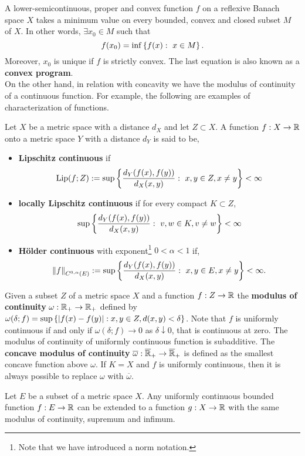A  lower-semicontinuous, proper and convex function $f$ on a reflexive Banach space $X$ takes a minimum value on every bounded, convex and closed subset $M$ of $X$. In other words, $\exists x_0 \in M$ such that
\begin{equation}
f(x_0)=\inf\left\lbrace f(x):\ x\in M \right\rbrace.
\end{equation}
Moreover, $x_0$ is unique if $f$ is strictly convex. The last equation is also known as a \textbf{convex program}. \\

On the other hand, in relation with concavity we have the modulus of continuity of a continuous function. For example, the following are examples of characterization of functions.
\begin{definition}
	Let $X$ be a metric space with a distance $d_X$ and let $Z \subset X$. A function $f: X\rightarrow \mathbb{R}$ onto a metric space $Y$ with a distance $d_Y$ is said to be,
	\begin{itemize}
		\item \textbf{Lipschitz continuous} if
		\begin{equation*}
		\mathrm{Lip}(f; Z):=\sup\left\lbrace \frac{d_Y(f(x), f(y))}{d_X(x,y)}: \ x,y \in Z, x\neq y \right\rbrace < \infty
		\end{equation*}
		\item \textbf{locally Lipschitz continuous} if for every compact $K\subset Z$,
		\begin{equation*}
		\sup\left\lbrace \frac{d_Y(f(x), f(y))}{d_X(x,y)}: \ v,w \in K, v\neq w \right\rbrace<\infty
		\end{equation*}
		\item  \textbf{H\"older continuous} with exponent\footnote{Note that we have introduced a norm notation.} $0<\alpha<1$ if,
		\begin{equation*}
			\left\|f\right\|_{C^{0,\alpha}(E)}:=\sup\left\lbrace \frac{d_Y(f(x),f(y))}{d_X(x,y)}: \ x, y \in E, x\neq y \right\rbrace<\infty.
		\end{equation*}
	\end{itemize}
\end{definition}
Given a subset $Z$ of a metric space $X$ and a function $f: Z\rightarrow \mathbb{R}$ the \textbf{modulus of continuity} $\omega:\mathbb{R}_+\rightarrow \mathbb{R}_+$ defined by $\omega(\delta;f)=\sup\left\lbrace \left| f(x)-f(y) \right|: x,y \in Z, d(x,y)<\delta \right\rbrace$. Note that $f$ is uniformly continuous if and only if $\omega(\delta; f)\rightarrow 0$ as $\delta\downarrow 0$, that is continuous at zero. The modulus of continuity of uniformly continuous function is subadditive. The \textbf{concave modulus of continuity} $\overline{\omega}:\overline{\mathbb{R}}_+\rightarrow \overline{\mathbb{R}}_+$ is defined as the smallest concave function above $\omega$. If $K=X$ and $f$ is uniformly continuous, then it is always possible to replace $\omega$ with $\overline{\omega}$.
\begin{theorem}
	Let $E$ be a subset of a metric space $X$. Any uniformly continuous bounded function $f:E\rightarrow\mathbb{R}$ can be extended to a function $g:X\rightarrow \mathbb{R}$ with the same modulus of continuity, supremum and infimum.
\end{theorem}

